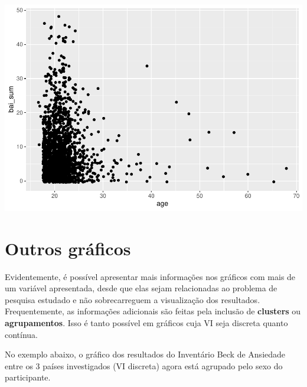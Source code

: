 \documentclass[
]{book}
\newenvironment{Shaded}{\begin{snugshade}}{\end{snugshade}}
\newcommand{\DataTypeTok}[1]{\textcolor[rgb]{0.13,0.29,0.53}{#1}}
\newcommand{\FloatTok}[1]{\textcolor[rgb]{0.00,0.00,0.81}{#1}}
\newcommand{\KeywordTok}[1]{\textcolor[rgb]{0.13,0.29,0.53}{\textbf{#1}}}
\newcommand{\NormalTok}[1]{#1}
\newcommand{\OperatorTok}[1]{\textcolor[rgb]{0.81,0.36,0.00}{\textbf{#1}}}
\newcommand{\StringTok}[1]{\textcolor[rgb]{0.31,0.60,0.02}{#1}}
\begin{document}
\includegraphics{gitbook-demo_files/figure-latex/unnamed-chunk-23-1.pdf}

\hypertarget{outros-gruxe1ficos}{%
\section{Outros gráficos}\label{outros-gruxe1ficos}}

Evidentemente, é possível apresentar mais informações nos gráficos com mais de um variável apresentada, desde que elas sejam relacionadas ao problema de pesquisa estudado e não sobrecarreguem a visualização dos resultados. Frequentemente, as informações adicionais são feitas pela inclusão de \textbf{clusters} ou \textbf{agrupamentos}. Isso é tanto possível em gráficos cuja VI seja discreta quanto contínua.

No exemplo abaixo, o gráfico dos resultados do Inventário Beck de Ansiedade entre os 3 países investigados (VI discreta) agora está agrupado pelo sexo do participante.

\begin{Shaded}
\end{Shaded}
\end{document}
